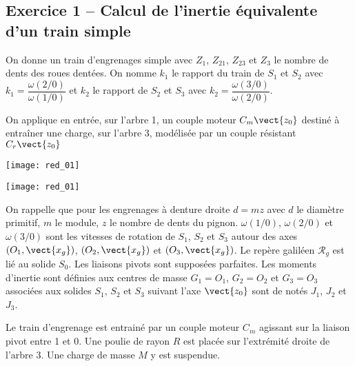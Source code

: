 \ifprof
\else
\begin{multicols}{2}
\fi


\section*{Exercice 1 -- Calcul de l'inertie équivalente d'un train simple}
\setcounter{subparagraph}{0}
On donne un train d'engrenages simple avec $Z_1$, $Z_{21}$, $Z_{23}$ et $Z_3$ le nombre de dents des roues dentées. On nomme $k_1$ le rapport du train de $S_1$ et $S_2$ avec $k_1=\dfrac{\omega(2/0)}{\omega(1/0)}$ et  
$k_2$ le rapport de $S_2$ et $S_3$ avec $k_2=\dfrac{\omega(3/0)}{\omega(2/0)}$. 

On applique en entrée, sur l'arbre 1, un couple moteur $C_m\vect{z_0}$ destiné à entraîner une charge, sur l'arbre 3, modélisée par un couple résistant  $C_r\vect{z_0}$

\ifprof
\begin{center}
\texttt{[image: red\_01]}
\end{center}
\else
\begin{center}
\texttt{[image: red\_01]}
\end{center}
\fi
On rappelle que pour les engrenages à denture droite $d=mz$ avec $d$ le diamètre primitif, $m$ le module, $z$ le nombre de dents du pignon. $\omega(1/0)$, $\omega(2/0)$ et $\omega(3/0)$ sont les vitesses de rotation de $S_1$, $S_2$ et $S_3$ autour des axes $\left(O_1,\vect{x_g}\right)$, $\left(O_2,\vect{x_g}\right)$ et $\left(O_3,\vect{x_g}\right)$. Le repère galiléen $\mathcal{R}_g$ est lié au solide $S_0$. Les liaisons pivots sont supposées parfaites. Les moments d'inertie sont définies aux centres de masse $G_1=O_1$, $G_2=O_2$ et $G_3=O_3$ associées aux solides $S_1$, $S_2$ et $S_3$ suivant l'axe $\vect{z_0}$ sont de notés $J_1$, $J_2$ et $J_3$. 

Le train d'engrenage est entrainé par un couple moteur $C_m$ agissant sur la liaison pivot entre 1 et 0. 
Une poulie de rayon $R$ est placée sur l'extrémité droite de l'arbre 3. Une charge de masse $M$ y est suspendue. 






\ifprof
\else
\end{multicols}
\fi
